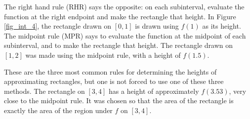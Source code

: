 The right hand rule (RHR) says the opposite: on each subinterval, evaluate the function at the right endpoint and make the rectangle that height. In  Figure \ref{fig_int_4}, the rectangle drawn on $[0,1]$ is drawn using $f(1)$ as its height. The midpoint rule (MPR) says to evaluate the function at the midpoint of each subinterval, and to make the rectangle that height. The rectangle drawn on $[1,2]$ was made using the midpoint rule, with a height of $f(1.5)$. 

These are the three most common rules for determining the heights of approximating rectangles, but one is not forced to use one of these three methods. The rectangle on $[3,4]$ has a height of approximately $f(3.53)$, very close to the midpoint rule. It was chosen so that the area of the rectangle is exactly the area of the region under $f$ on $[3,4]$.





	


